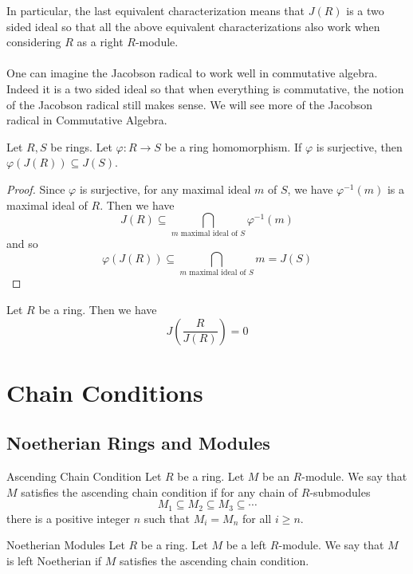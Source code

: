 \documentclass[a4paper]{article}
\begin{document}
In particular, the last equivalent characterization means that $J(R)$ is a two sided ideal so that all the above equivalent characterizations also work when considering $R$ as a right $R$-module. \\~\\

One can imagine the Jacobson radical to work well in commutative algebra. Indeed it is a two sided ideal so that when everything is commutative, the notion of the Jacobson radical still makes sense. We will see more of the Jacobson radical in Commutative Algebra. 

\begin{lmm}{}{} Let $R,S$ be rings. Let $\varphi:R\to S$ be a ring homomorphism. If $\varphi$ is surjective, then $\varphi(J(R))\subseteq J(S)$. 
\begin{proof}
Since $\varphi$ is surjective, for any maximal ideal $m$ of $S$, we have $\varphi^{-1}(m)$ is a maximal ideal of $R$. Then we have $$J(R)\subseteq\bigcap_{m\text{ maximal ideal of }S}\varphi^{-1}(m)$$ and so $$\varphi(J(R))\subseteq\bigcap_{m\text{ maximal ideal of }S}m=J(S)$$
\end{proof}
\end{lmm}

\begin{lmm}{}{} Let $R$ be a ring. Then we have $$J\left(\frac{R}{J(R)}\right)=0$$
\end{lmm}

\pagebreak
\section{Chain Conditions}
\subsection{Noetherian Rings and Modules}
\begin{defn}{Ascending Chain Condition}{} Let $R$ be a ring. Let $M$ be an $R$-module. We say that $M$ satisfies the ascending chain condition if for any chain of $R$-submodules $$M_1\subseteq M_2\subseteq M_3\subseteq\cdots$$ there is a positive integer $n$ such that $M_i=M_n$ for all $i\geq n$. 
\end{defn}

\begin{defn}{Noetherian Modules}{} Let $R$ be a ring. Let $M$ be a left $R$-module. We say that $M$ is left Noetherian if $M$ satisfies the ascending chain condition. 
\end{defn}
\end{document}
